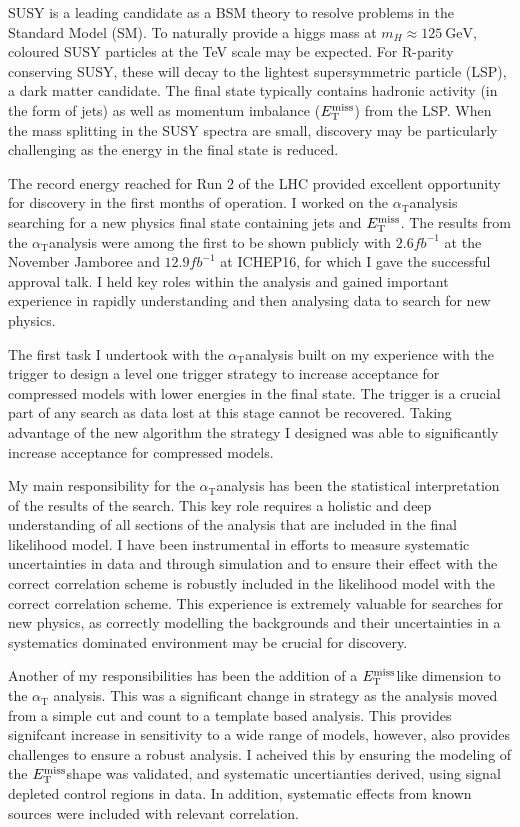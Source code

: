 \documentclass[11pt]{article}
\theoremstyle{plain} \numberwithin{equation}{section}
\theoremstyle{definition}
\DeclareRobustCommand{\alphat}{$\alpha_{\text{T}}$}
\DeclareRobustCommand{\met}{$\mbox{$E_\text{T}^{\rm miss}$}\xspace$}
\newcounter{list}
\begin{document}
SUSY is a leading candidate as a BSM theory to resolve problems in the Standard Model (SM).
To naturally provide a higgs mass at $m_H \approx 125~\text{GeV}$, coloured SUSY particles at the TeV
scale may be expected. For R-parity conserving SUSY, these will decay to the 
lightest supersymmetric particle (LSP), a dark matter candidate. The final state 
typically contains hadronic activity (in the form of jets) as well as momentum 
imbalance (\met) from the LSP. When the mass splitting in the SUSY spectra are small, 
discovery may be particularly challenging as the energy in the final state is reduced.

The record energy reached for Run 2 of the LHC provided excellent opportunity for discovery
in the first months of operation. I worked on the \alphat analysis searching
for a new physics final state containing jets and \met. The results from the 
\alphat analysis were among the first to be shown publicly with $2.6{fb}^{-1}$ at the 
November Jamboree and $12.9{fb}^{-1}$ at ICHEP16, for which I gave the successful
approval talk. I held key roles within the analysis and gained important experience 
in rapidly understanding and then analysing data to search for new physics. 

The first task I undertook with the \alphat analysis built on my experience with the 
trigger to design a level one trigger strategy to increase acceptance for compressed models
with lower energies in the final state. The trigger is a crucial part of any search
as data lost at this stage cannot be recovered. Taking advantage of the new algorithm
the strategy I designed was able to significantly increase acceptance for compressed models.

My main responsibility for the \alphat analysis has been the statistical interpretation
of the results of the search. This key role requires a holistic and deep understanding
of all sections of the analysis that are included in the final likelihood model. I have been 
instrumental in efforts to measure systematic uncertainties in data and through simulation and to
ensure their effect with the correct correlation scheme is robustly included in the likelihood 
model with the correct correlation scheme. This experience is extremely valuable for searches 
for new physics, as correctly modelling the backgrounds and their uncertainties in a systematics 
dominated environment may be crucial for discovery.

Another of my responsibilities has been the addition of a \met like dimension to the \alphat
analysis. This was a significant change in strategy as the analysis moved from a simple cut and
count to a template based analysis. This provides signifcant increase in sensitivity to a wide 
range of models, however, also provides challenges to ensure a robust analysis. I acheived this
by ensuring the modeling of the \met shape was validated, and systematic uncertianties derived, 
using signal depleted control regions in data. In addition, systematic effects from known sources were included
with relevant correlation.
\end{document}
